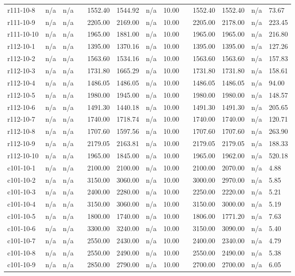 \documentclass[final,5p,times,twocolumn]{elsarticle}
\begin{document}
{{{{{{{{{{{{{\begin{longtable}{l l l l l l l l l l l l l}
r111-10-8& n/a& n/a&&1552.40& 1544.92& n/a& 10.00&&1552.40& 1552.40& n/a& 73.67\\
r111-10-9& n/a& n/a&&2205.00& 2169.00& n/a& 10.00&&2205.00& 2178.00& n/a& 223.45\\
r111-10-10& n/a& n/a&&1965.00& 1881.00& n/a& 10.00&&1965.00& 1965.00& n/a& 216.80\\
r112-10-1& n/a& n/a&&1395.00& 1370.16& n/a& 10.00&&1395.00& 1395.00& n/a& 127.26\\
r112-10-2& n/a& n/a&&1563.60& 1534.16& n/a& 10.00&&1563.60& 1563.60& n/a& 157.83\\
r112-10-3& n/a& n/a&&1731.80& 1665.29& n/a& 10.00&&1731.80& 1731.80& n/a& 158.61\\
r112-10-4& n/a& n/a&&1486.05& 1486.05& n/a& 10.00&&1486.05& 1486.05& n/a& 94.00\\
r112-10-5& n/a& n/a&&1980.00& 1945.00& n/a& 10.00&&1980.00& 1980.00& n/a& 148.57\\
r112-10-6& n/a& n/a&&1491.30& 1440.18& n/a& 10.00&&1491.30& 1491.30& n/a& 205.65\\
r112-10-7& n/a& n/a&&1740.00& 1718.74& n/a& 10.00&&1740.00& 1740.00& n/a& 120.71\\
r112-10-8& n/a& n/a&&1707.60& 1597.56& n/a& 10.00&&1707.60& 1707.60& n/a& 263.90\\
r112-10-9& n/a& n/a&&2179.05& 2163.81& n/a& 10.00&&2179.05& 2179.05& n/a& 188.33\\
r112-10-10& n/a& n/a&&1965.00& 1845.00& n/a& 10.00&&1965.00& 1962.00& n/a& 520.18\\
c101-10-1& n/a& n/a&&2100.00& 2100.00& n/a& 10.00&&2100.00& 2070.00& n/a& 4.88\\
c101-10-2& n/a& n/a&&3150.00& 3060.00& n/a& 10.00&&3000.00& 2970.00& n/a& 5.85\\
c101-10-3& n/a& n/a&&2400.00& 2280.00& n/a& 10.00&&2250.00& 2220.00& n/a& 5.21\\
c101-10-4& n/a& n/a&&3150.00& 3060.00& n/a& 10.00&&3150.00& 3000.00& n/a& 5.19\\
c101-10-5& n/a& n/a&&1800.00& 1740.00& n/a& 10.00&&1806.00& 1771.20& n/a& 7.63\\
c101-10-6& n/a& n/a&&3300.00& 3240.00& n/a& 10.00&&3150.00& 3090.00& n/a& 5.40\\
c101-10-7& n/a& n/a&&2550.00& 2430.00& n/a& 10.00&&2400.00& 2340.00& n/a& 4.79\\
c101-10-8& n/a& n/a&&2550.00& 2490.00& n/a& 10.00&&2550.00& 2490.00& n/a& 5.38\\
c101-10-9& n/a& n/a&&2850.00& 2790.00& n/a& 10.00&&2700.00& 2700.00& n/a& 6.05\\

\end{longtable}}}}}}}}}}}}}}
\end{document}
